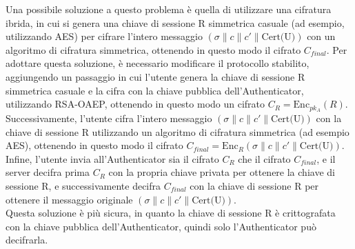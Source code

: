 Una possibile soluzione a questo problema è quella di utilizzare una cifratura ibrida, in cui si genera una chiave di sessione R simmetrica casuale (ad esempio, utilizzando AES) per cifrare l'intero messaggio $(\sigma \| c\| c'\| \text{Cert(U)})$ con un algoritmo di cifratura simmetrica, ottenendo in questo modo il cifrato $C_{final}$. Per adottare questa soluzione, è necessario modificare il protocollo stabilito, aggiungendo un passaggio in cui l'utente genera la chiave di sessione R simmetrica casuale e la cifra con la chiave pubblica dell'Authenticator, utilizzando RSA-OAEP, ottenendo in questo modo un cifrato $C_R = \text{Enc}_{pk_A}(R)$. Successivamente, l'utente cifra l'intero messaggio $(\sigma \| c\| c'\| \text{Cert(U)})$ con la chiave di sessione R utilizzando un algoritmo di cifratura simmetrica (ad esempio AES), ottenendo in questo modo il cifrato $C_{final} = \text{Enc}_R(\sigma \| c\| c'\| \text{Cert(U)})$. Infine, l'utente invia all'Authenticator sia il cifrato $C_R$ che il cifrato $C_{final}$, e il server decifra prima $C_R$ con la propria chiave privata per ottenere la chiave di sessione R, e successivamente decifra $C_{final}$ con la chiave di sessione R per ottenere il messaggio originale $(\sigma \| c\| c'\| \text{Cert(U)})$.\\
Questa soluzione è più sicura, in quanto la chiave di sessione R è crittografata con la chiave pubblica dell'Authenticator, quindi solo l'Authenticator può decifrarla.